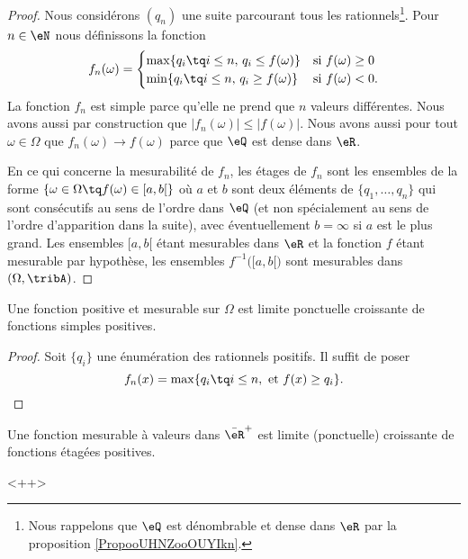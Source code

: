 \begin{proof}
    Nous considérons \( (q_n)\) une suite parcourant tous les rationnels\footnote{Nous rappelons que \( \eQ\) est dénombrable et dense dans \( \eR\) par la proposition \ref{PropooUHNZooOUYIkn}.}.
    Pour \( n\in \eN\) nous définissons la fonction
    \begin{equation}
        f_n(\omega)=\begin{cases}
            \max\{ q_i\tq i\leq n,\, q_i\leq f(\omega) \}    &   \text{si \( f(\omega)\geq 0\)}\\
            \min\{ q_i\tq i\leq n,\, q_i\geq f(\omega) \}    &    \text{si \( f(\omega)< 0\).}
        \end{cases}
    \end{equation}
    La fonction \( f_n\) est simple parce qu'elle ne prend que \( n\) valeurs différentes. Nous avons aussi par construction que \( | f_n(\omega)|\leq |f(\omega) |\). Nous avons aussi pour tout \( \omega\in \Omega\) que \( f_n(\omega)\to f(\omega)\) parce que \( \eQ\) est dense dans \( \eR\).

    En ce qui concerne la mesurabilité de \( f_n\), les étages de \( f_n\) sont les ensembles de la forme \( \{ \omega\in \Omega\tq f(\omega)\in\mathopen[ a , b [ \}\) où \( a\) et \( b\) sont deux éléments de \( \{ q_1,\ldots, q_n \}\) qui sont consécutifs au sens de l'ordre dans \( \eQ\) (et non spécialement au sens de l'ordre d'apparition dans la suite), avec éventuellement \( b=\infty\) si \( a\) est le plus grand. Les ensembles \( \mathopen[ a , b [\) étant mesurables dans \( \eR\) et la fonction \( f\) étant mesurable par hypothèse, les ensembles \( f^{-1}\Big( \mathopen[ a , b [ \Big)\) sont mesurables dans \( (\Omega,\tribA)\).
\end{proof}

\begin{proposition}\label{PropWBavIf}
    Une fonction positive et mesurable sur \( \Omega\) est limite ponctuelle croissante de fonctions simples positives.
\end{proposition}

\begin{proof}
    Soit \( \{ q_i \}\) une énumération des rationnels positifs. Il suffit de poser
    \begin{equation}
        f_n(x)=\max\{ q_i\tq i\leq n,\text{ et }f(x)\geq q_i \}.
    \end{equation}
\end{proof}

\begin{theorem}\label{THOooXHIVooKUddLi}       
    Une fonction mesurable à valeurs dans \( \bar \eR^+\) est limite (ponctuelle) croissante de fonctions étagées positives.
\end{theorem}
<++>

